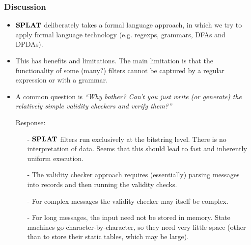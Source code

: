 \documentclass{beamer}
\newcommand{\konst}[1]{\ensuremath{\mbox{\bf{#1}}}}
\begin{document}
\begin{frame}[allowframebreaks] \frametitle{Discussion}

\begin{itemize}

\item \konst{SPLAT} deliberately takes a formal language approach, in which
we try to apply formal language technology (e.g. regexps, grammars,
DFAs and DPDAs).

\vspace*{5mm}

\item This has benefits and limitations. The main limitation is that
  the functionality of some (many?) filters cannot be captured by a
  regular expression or with a grammar.

\vspace*{5mm}

\item A common question is \textit{``Why bother? Can't you just write (or generate) the
relatively simple validity checkers and verify them?''}

\framebreak

Response:
 
\begin{itemize}

\item[-] \konst{SPLAT} filters run exclusively at the bitstring level. There is
  no interpretation of data. Seems that this should lead to fast and
  inherently uniform execution.

\vspace*{3mm}

\item[-] The validity checker approach requires (essentially) parsing
  messages into records and then running the validity checks. 

\vspace*{3mm}

\item[-] For complex messages the validity checker may itself be complex.

\vspace*{3mm}

\item[-] For long messages, the input need not be stored in
  memory. State machines go character-by-character, so they need very
  little space (other than to store their static tables, which may be large).

\end{itemize}
\end{itemize}

\end{frame}
\end{document}
